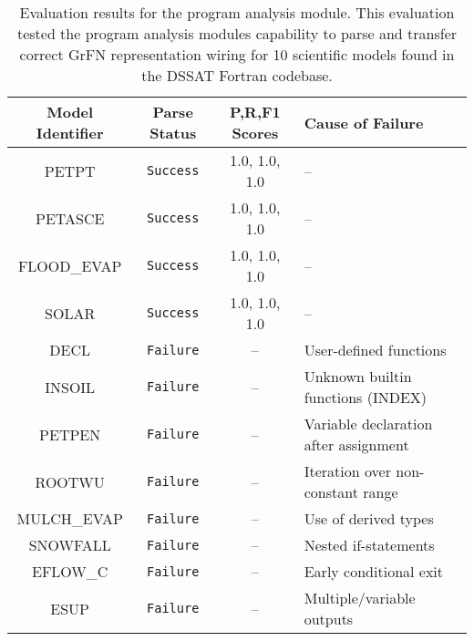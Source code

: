 \begin{center}
  \begin{table}
    \centering
    \label{tab:pa_eval_table}
    \begin{tabular}{ |c|c|c|l| }
     \hline
     \textbf{Model Identifier} & \textbf{Parse Status} & \textbf{P,R,F1 Scores} & \textbf{Cause of Failure} \\
     \hline
     PETPT & \texttt{Success} & 1.0, 1.0, 1.0 & -- \\
     PETASCE & \texttt{Success} & 1.0, 1.0, 1.0 & -- \\
     \hline
     FLOOD\_EVAP & \texttt{Success} & 1.0, 1.0, 1.0 & -- \\
     SOLAR & \texttt{Success} & 1.0, 1.0, 1.0 & -- \\
     DECL & \texttt{Failure} & -- & User-defined functions \\
     INSOIL & \texttt{Failure} & -- & Unknown builtin functions (INDEX) \\
     PETPEN & \texttt{Failure} & -- & Variable declaration after assignment \\
     ROOTWU & \texttt{Failure} & -- & Iteration over non-constant range \\
     MULCH\_EVAP & \texttt{Failure} & -- & Use of derived types \\
     SNOWFALL & \texttt{Failure} & -- & Nested if-statements \\
     EFLOW\_C & \texttt{Failure} & -- & Early conditional exit \\
     ESUP & \texttt{Failure} & -- & Multiple/variable outputs \\
     \hline
    \end{tabular}
    \caption[Program Analysis Module Evaluation]{Evaluation results for the program analysis module. This evaluation tested the program analysis modules capability to parse and transfer correct GrFN representation wiring for 10 scientific models found in the DSSAT Fortran codebase.}
  \end{table}
\end{center}
